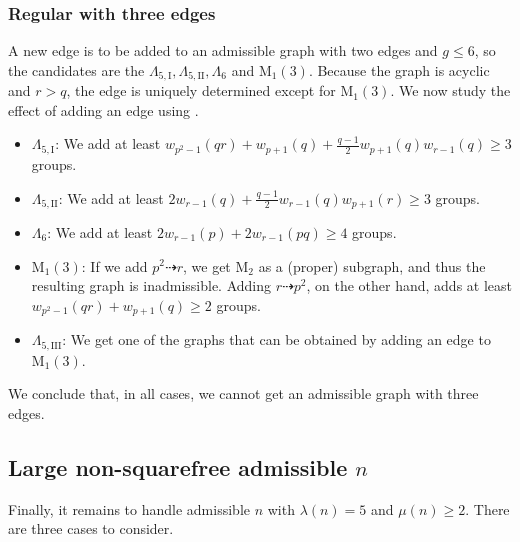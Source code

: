 \documentclass{article}
\newcommand{\qlame}{\Lambda_{5,\text{I}}}
\newcommand{\qlamz}{\Lambda_{5,\text{II}}}
\newcommand{\qlamd}{\Lambda_{5,\text{III}}}
\newcommand{\m}[1]{\text{M}_{#1}}
\newcommand{\hthref}[1]{\hyperref[#1]{\thref{#1}}}
\theoremstyle{plain}
\theoremstyle{definition}
\begin{document}
\begin{center}
\end{center}

\subsubsection*{Regular  with three edges}
A new edge is to be added to an admissible graph with two edges and $g \le 6$, so the candidates are the $\qlame, \qlamz, \Lambda_6$ and $\m1(3)$. Because the graph is acyclic and $r > q$, the edge is uniquely determined except for $\m1(3)$. We now study the effect of adding an edge using \hthref{euppqr}.
\begin{itemize}
	\item $\qlame$: We add at least $w_{p^2 - 1}(qr) + w_{p + 1}(q) + \frac{q - 1}{2}w_{p + 1}(q)w_{r - 1}(q) \ge 3$ groups.
	\item $\qlamz$: We add at least $2w_{r - 1}(q) + \frac{q - 1}{2} w_{r - 1}(q)w_{p + 1}(r) \ge 3$ groups.
	\item $\Lambda_6$: We add at least $2w_{r - 1}(p) + 2w_{r - 1}(pq) \ge 4$ groups.
	\item $\m1(3)$: If we add $p^2 \dashrightarrow r$, we get $\m{2}$ as a (proper) subgraph, and thus the resulting graph is inadmissible. Adding $r \dashrightarrow p^2$, on the other hand, adds at least $w_{p^2 - 1}(qr) + w_{p + 1}(q) \ge 2$ groups.
	\item $\qlamd$: We get one of the graphs that can be obtained by adding an edge to $\m1(3)$.
\end{itemize}
We conclude that, in all cases, we cannot get an admissible graph with three edges.


\subsection{Large non-squarefree admissible $n$} 
Finally, it remains to handle admissible $n$ with $\lambda(n) = 5$ and $\mu(n) \ge 2$. There are three cases to consider.
\end{document}
